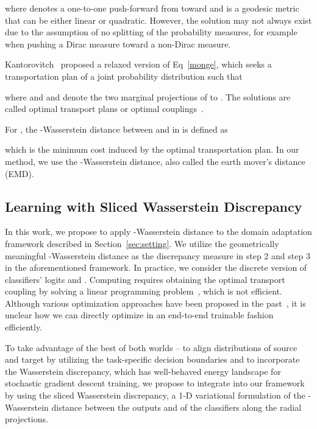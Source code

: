 \documentclass[10pt,twocolumn,letterpaper]{article}
\begin{document}
where   denotes a one-to-one push-forward from  toward   and  is a geodesic metric that can be either linear or quadratic. However, the  solution  may not always exist due to the assumption of no splitting of the probability measures, for example when pushing a Dirac measure toward a non-Dirac measure.

Kantorovitch~\cite{kantorovitch1958translocation} proposed a relaxed version of Eq~\ref{monge}, which seeks a transportation plan of a joint probability distribution  such that

where   and  and  denote the two marginal projections of 
 to . The solutions  are called optimal transport plans or optimal couplings~\cite{villani2009optimal}.


For , the -Wasserstein distance between  and  in  is defined as

which is the minimum cost induced by the optimal transportation plan. 
In our method, we use the -Wasserstein distance, also called the earth mover's distance (EMD).


\subsection{Learning with Sliced Wasserstein Discrepancy}
\label{sec:wd}
In this work, we propose to apply -Wasserstein distance to the domain adaptation framework described in Section~\ref{sec:setting}. We utilize the geometrically meaningful -Wasserstein distance as the discrepancy measure in step 2 and step 3 in the aforementioned framework.
In practice, we consider the discrete version of classifiers' logits  and . Computing  requires obtaining the optimal transport coupling  by solving a linear programming problem~\cite{kantorovitch1958translocation}, which is not efficient.
Although various optimization approaches have been proposed in the past~\cite{cuturi2013sinkhorn, frogner2015learning}, it is unclear how we can directly optimize  in an end-to-end trainable fashion efficiently.

To take advantage of the best of both worlds -- to align distributions of source and target by utilizing the task-specific decision boundaries and to incorporate the Wasserstein discrepancy, which has well-behaved energy landscape for stochastic gradient descent training, we propose to integrate  into our framework by using the sliced Wasserstein discrepancy, a 1-D variational formulation of the -Wasserstein distance between the outputs  and  of the classifiers along the radial projections. 
\end{document}
